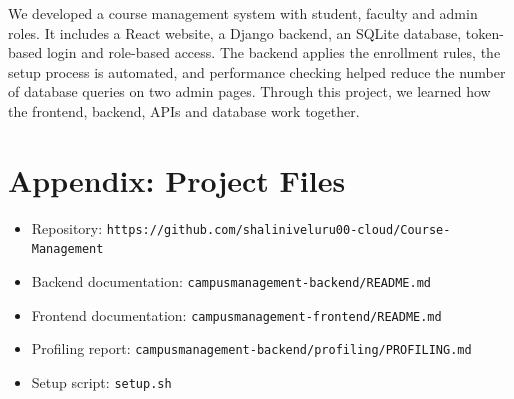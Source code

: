 \documentclass[11pt,a4paper]{article}
\begin{document}
We developed a course management system with student, faculty and admin roles.
It includes a React website, a Django backend, an SQLite database, token-based
login and role-based access. The backend applies the enrollment rules, the
setup process is automated, and performance checking helped reduce the number
of database queries on two admin pages. Through this project, we learned how
the frontend, backend, APIs and database work together.

\section*{Appendix: Project Files}

\begin{itemize}
    \item Repository:
    \texttt{https://github.com/shaliniveluru00-cloud/Course-Management}
    \item Backend documentation:
    \texttt{campusmanagement-backend/README.md}
    \item Frontend documentation:
    \texttt{campusmanagement-frontend/README.md}
    \item Profiling report:
    \texttt{campusmanagement-backend/profiling/PROFILING.md}
    \item Setup script: \texttt{setup.sh}
\end{itemize}
\end{document}
